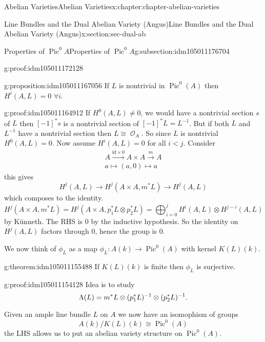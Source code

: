 \documentclass[oneside,10pt,]{book}
\newcommand{\qedhere}{\relax}
\numberwithin{equation}{section}
\newcommand{\sheaf}[1]{\operatorname{\mathcal{#1}}}
\newcommand{\lb}{[}
\newcommand{\rb}{]}
\newcommand{\id}{\mathrm{id}}
\DeclareMathOperator{\Pic}{Pic}
\newcommand{\lt}{<}
\begin{document}
\begin{chapterptx}{Abelian Varieties}{}{Abelian Varieties}{}{}{x:chapter:chapter-abelian-varieties}
\begin{sectionptx}{Line Bundles and the Dual Abelian Variety (Angus)}{}{Line Bundles and the Dual Abelian Variety (Angus)}{}{}{x:section:sec-dual-ab}
\begin{subsectionptx}{Properties of \(\Pic^0 A\)}{}{Properties of \(\Pic^0 A\)}{}{}{g:subsection:idm105011176704}
\begin{proofptx}{}{g:proof:idm105011172128}
\end{proofptx}
\begin{proposition}{}{}{g:proposition:idm105011167056}%
If \(L\) is nontrivial in \(\Pic^0(A)\) then \(H^i(A,L) = 0\) \(\forall i\).%
\end{proposition}
\begin{proofptx}{}{g:proof:idm105011164912}
If \(H^0(A,L) \ne 0\), we would have  a nontrivial section \(s\) of \(L\) then \(\lb -1\rb ^* s\) is   a nontrivial section of \(\lb-1\rb^* L = L^{-1}\). But if both \(L\) and \(L^{-1}\) have  a nontrivial section then \(L \cong \sheaf O_A\). So since \(L\) is nontrivial \(H^0(A,L) = 0\). Now assume \(H^i(A,L) = 0\) for all \(i\lt j\). Consider%
\begin{gather*}
A\xrightarrow{\id \times 0} A\times A \xrightarrow m A\\
a\mapsto (a,0)\mapsto a
\end{gather*}
this gives%
\begin{equation*}
H^j(A, L) \to H^j(A\times A, m^*L) \to H^j(A,L)
\end{equation*}
which composes to the identity.%
\begin{equation*}
H^j(A\times A, m^*L) =  H^j(A\times A, p_1^*L \otimes p_2^*L) = \bigoplus_{i=0}^j H^i(A,L) \otimes H^{j-i}(A,L)
\end{equation*}
by Künneth. The RHS is 0 by the inductive hypothesis. So the identity on \(H^j(A,L)\) factors through 0, hence the group is 0.%
\end{proofptx}
We now think of \(\phi_L\) as a map \(\phi_L \colon A(k) \to \Pic^0(A)\) with kernel \(K(L) (k)\).%
\begin{theorem}{}{}{g:theorem:idm105011155488}%
If \(K(L)(k)\) is finite then \(\phi_L\) is surjective.%
\end{theorem}
\begin{proofptx}{}{g:proof:idm105011154128}
Idea is to study%
\begin{equation*}
\Lambda (L) =  m^* L \otimes (p_1^* L)^{-1} \otimes (p_2^* L)^{-1}\text{.}\qedhere
\end{equation*}
%
\end{proofptx}
Given an ample line bundle \(L\) on \(A\) we now have an isomophism of groups%
\begin{equation*}
A(k)/K(L)(k) \cong \Pic^0(A)
\end{equation*}
the LHS allows us to put an abelian variety structure on \(\Pic^0(A)\).%
\end{subsectionptx}
%
%
\typeout{************************************************}

\end{sectionptx}
\end{chapterptx}
\end{document}
